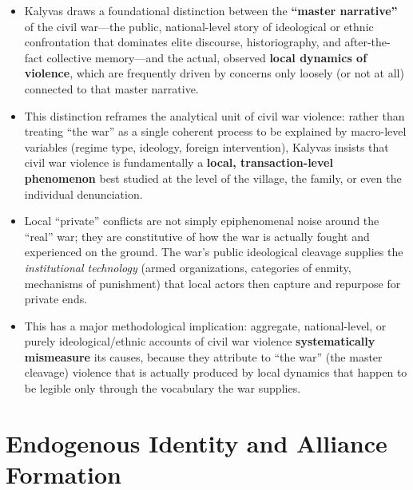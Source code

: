 \documentclass[12pt]{article}
\begin{document}
\begin{itemize}[leftmargin=*, itemsep=4pt]
    \item Kalyvas draws a foundational distinction between the \textbf{``master narrative''} of the civil war---the public, national-level story of ideological or ethnic confrontation that dominates elite discourse, historiography, and after-the-fact collective memory---and the actual, observed \textbf{local dynamics of violence}, which are frequently driven by concerns only loosely (or not at all) connected to that master narrative.
    \item This distinction reframes the analytical unit of civil war violence: rather than treating ``the war'' as a single coherent process to be explained by macro-level variables (regime type, ideology, foreign intervention), Kalyvas insists that civil war violence is fundamentally a \textbf{local, transaction-level phenomenon} best studied at the level of the village, the family, or even the individual denunciation.
    \item Local ``private'' conflicts are not simply epiphenomenal noise around the ``real'' war; they are constitutive of how the war is actually fought and experienced on the ground. The war's public ideological cleavage supplies the \emph{institutional technology} (armed organizations, categories of enmity, mechanisms of punishment) that local actors then capture and repurpose for private ends.
    \item This has a major methodological implication: aggregate, national-level, or purely ideological/ethnic accounts of civil war violence \textbf{systematically mismeasure} its causes, because they attribute to ``the war'' (the master cleavage) violence that is actually produced by local dynamics that happen to be legible only through the vocabulary the war supplies.
\end{itemize}

\section{Endogenous Identity and Alliance Formation}
\end{document}
